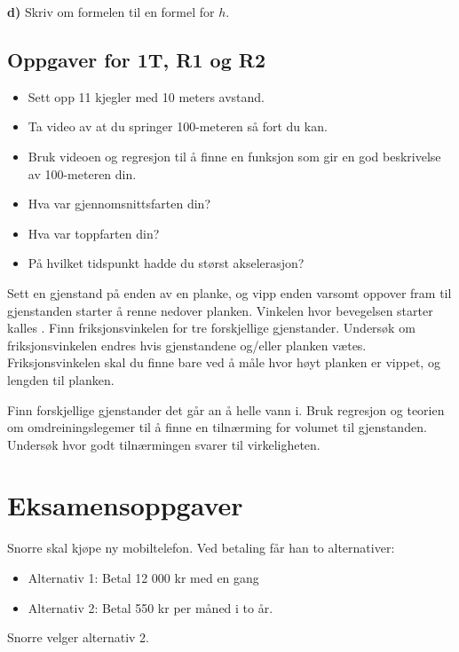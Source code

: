 \textbf{d)} Skriv om formelen til en formel for $ h $.

\newpage
\subsection*{Oppgaver for 1T, R1 og R2}
\begin{itemize}
	\item Sett opp 11 kjegler med 10 meters avstand. 
	\item Ta video av at du springer 100-meteren så fort du kan. 
	\item Bruk videoen og regresjon til å finne en funksjon som gir en god beskrivelse av 100-meteren din. 
	\item Hva var gjennomsnittsfarten din?
	\item Hva var toppfarten din?
	\item På hvilket tidspunkt hadde du størst akselerasjon?
\end{itemize}

Sett en gjenstand på enden av en planke, og vipp enden varsomt oppover fram til gjenstanden starter å renne nedover planken. Vinkelen hvor bevegelsen starter kalles . Finn friksjonsvinkelen for tre forskjellige gjenstander. Undersøk om friksjonsvinkelen endres hvis gjenstandene og/eller planken vætes. Friksjonsvinkelen skal du finne bare ved å måle hvor høyt planken er vippet, og lengden til planken.


Finn forskjellige gjenstander det går an å helle vann i. Bruk regresjon og teorien om omdreiningslegemer til å finne en tilnærming for volumet til gjenstanden. Undersøk hvor godt tilnærmingen svarer til virkeligheten.


\newpage
\section{Eksamensoppgaver}
\st{
\eksbm
}

Snorre skal kjøpe ny mobiltelefon.
Ved betaling får han to alternativer:
\begin{itemize}
	\item Alternativ 1: Betal 12 000 kr med en gang
	\item Alternativ 2: Betal 550 kr per måned i to år.
\end{itemize}
Snorre velger alternativ 2. \os

